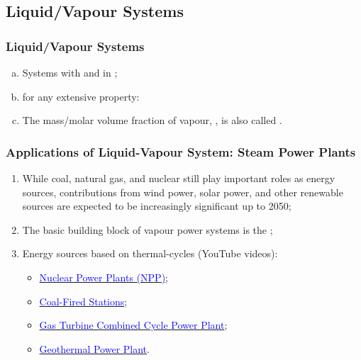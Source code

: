 \documentclass[10pt,compress,handout,unknownkeysallowed]{beamer}
\begin{document}
\subsection{Liquid/Vapour Systems}
\begin{frame}
  \frametitle{Liquid/Vapour Systems}
     \begin{enumerate}[(a)]
         \item<1-> Systems with  and  in ;
         \item<2->  for any extensive property:
         \item<4-> The mass/molar volume fraction of vapour, , is also called . 
     \end{enumerate}

\end{frame}
\normalsize

\begin{frame}
 \frametitle{Applications of Liquid-Vapour System: Steam Power Plants}

    \begin{enumerate}%
     \item <1-> While coal, natural gas, and nuclear still play important roles as energy sources, contributions from wind power, solar power, and other renewable sources are expected to be increasingly significant up to 2050;
     \item <3-> The basic building block of vapour power systems is the ;
     \item <4-> Energy sources based on thermal-cycles (YouTube videos):
        \begin{itemize}%
           \item \href{http://www.youtube.com/watch?v=_UwexvaCMWA}{\textcolor{blue}{Nuclear Power Plants (NPP)}};
           \item \href{http://www.youtube.com/watch?v=0mjT8ETB128}{\textcolor{blue}{Coal-Fired Stations}};
           \item \href{http://www.youtube.com/watch?v=oi1TRbiE_Kw}{\textcolor{blue}{Gas Turbine Combined Cycle Power Plant}};
           \item \href{https://www.youtube.com/watch?v=kjpp2MQffnw}{\textcolor{blue}{Geothermal Power Plant}}.
        \end{itemize}
    \end{enumerate} 
 \normalsize
\end{frame}
\end{document}
